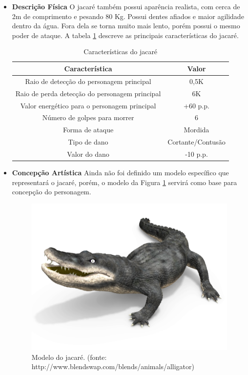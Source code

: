 \begin{itemize}
\item {\bf Descrição Física}
O jacaré também possui aparência realista, com cerca de 2m de comprimento e
 pesando 80 Kg. Possui dentes afiados e maior agilidade dentro da água.
 Fora dela se torna muito mais lento, porém possui o mesmo poder de ataque.
 A tabela \ref{table:jacare} descreve as principais características do jacaré.

\begin{table}[H]
\begin{center}
\begin{tabular}{|c|c|}
\hline 
\textbf{Característica} & \textbf{Valor} \\ 
\hline 
Raio de detecção do personagem principal & 0,5K \\ 
\hline 
Raio de perda detecção do personagem principal & 6K \\ 
\hline 
Valor energético para o personagem principal & +60 p.p. \\ 
\hline 
Número de golpes para morrer & 6 \\ 
\hline 
Forma de ataque & Mordida \\ 
\hline 
Tipo de dano & Cortante/Contusão \\ 
\hline 
Valor do dano & -10 p.p. \\ 
\hline 
\end{tabular} 
\caption{Características do jacaré}
\label{table:jacare}
\end{center}
\end{table}

\item {\bf Concepção Artística}
Ainda não foi definido um modelo específico que representará o jacaré,
 porém, o modelo da Figura \ref{img:jacare} servirá como base para concepção do
 personagem.
\newpage
\begin{figure}[H]
 \centering
 \includegraphics[scale=1]{Imagens/jacare01.png}
 \caption{Modelo do jacaré. (fonte: http://www.blendswap.com/blends/animals/alligator)}
\label{img:jacare}
\end{figure}


\end{itemize}
